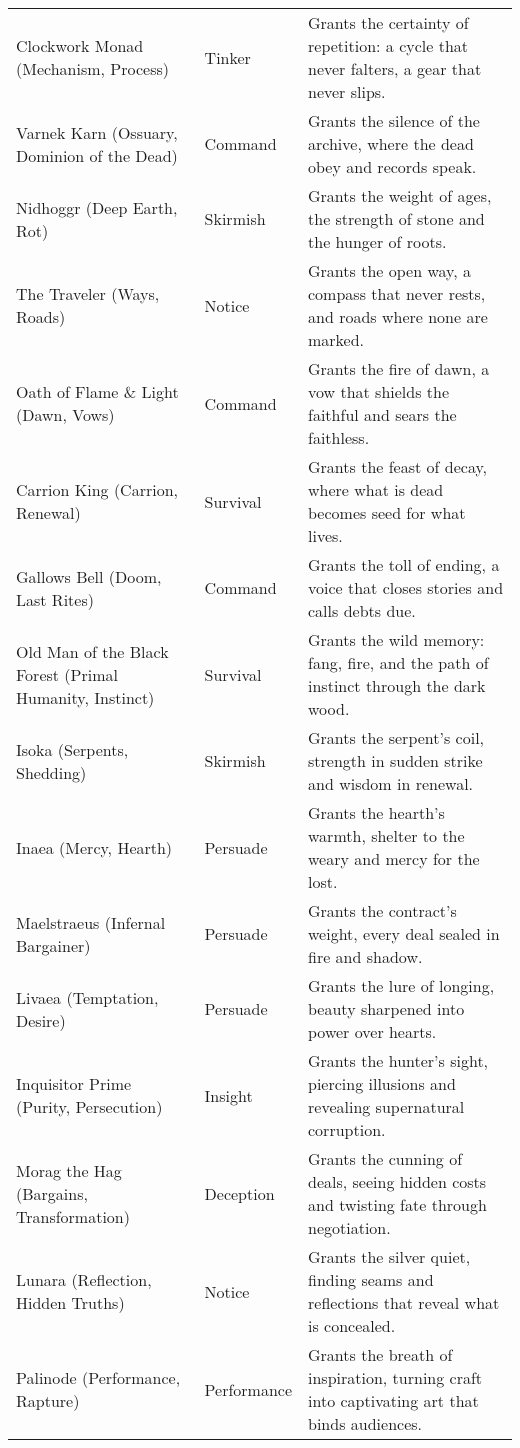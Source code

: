 \begin{table}[H]
\begin{tabular}{@{}p{3.8cm}p{3.8cm}p{7.5cm}@{}}
  Clockwork Monad (Mechanism, Process) & Tinker & Grants the certainty of repetition: a cycle that never falters, a gear that never slips. \\
  Varnek Karn (Ossuary, Dominion of the Dead) & Command & Grants the silence of the archive, where the dead obey and records speak. \\
  Nidhoggr (Deep Earth, Rot) & Skirmish & Grants the weight of ages, the strength of stone and the hunger of roots. \\
  The Traveler (Ways, Roads) & Notice & Grants the open way, a compass that never rests, and roads where none are marked. \\
  Oath of Flame \& Light (Dawn, Vows) & Command & Grants the fire of dawn, a vow that shields the faithful and sears the faithless. \\
  Carrion King (Carrion, Renewal) & Survival & Grants the feast of decay, where what is dead becomes seed for what lives. \\
  Gallows Bell (Doom, Last Rites) & Command & Grants the toll of ending, a voice that closes stories and calls debts due. \\
  Old Man of the Black Forest (Primal Humanity, Instinct) & Survival & Grants the wild memory: fang, fire, and the path of instinct through the dark wood. \\
  Isoka (Serpents, Shedding) & Skirmish & Grants the serpent's coil, strength in sudden strike and wisdom in renewal. \\
  Inaea (Mercy, Hearth) & Persuade & Grants the hearth's warmth, shelter to the weary and mercy for the lost. \\
  Maelstraeus (Infernal Bargainer) & Persuade & Grants the contract's weight, every deal sealed in fire and shadow. \\
  Livaea (Temptation, Desire) & Persuade & Grants the lure of longing, beauty sharpened into power over hearts. \\
  Inquisitor Prime (Purity, Persecution) & Insight & Grants the hunter's sight, piercing illusions and revealing supernatural corruption. \\
  Morag the Hag (Bargains, Transformation) & Deception & Grants the cunning of deals, seeing hidden costs and twisting fate through negotiation. \\
  Lunara (Reflection, Hidden Truths) & Notice & Grants the silver quiet, finding seams and reflections that reveal what is concealed. \\
  Palinode (Performance, Rapture) & Performance & Grants the breath of inspiration, turning craft into captivating art that binds audiences. \\

\end{tabular}
\end{table}
